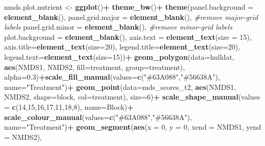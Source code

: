 \documentclass[
]{article}
\newenvironment{Shaded}{\begin{snugshade}}{\end{snugshade}}
\newcommand{\AttributeTok}[1]{\textcolor[rgb]{0.13,0.29,0.53}{#1}}
\newcommand{\CommentTok}[1]{\textcolor[rgb]{0.56,0.35,0.01}{\textit{#1}}}
\newcommand{\DecValTok}[1]{\textcolor[rgb]{0.00,0.00,0.81}{#1}}
\newcommand{\FloatTok}[1]{\textcolor[rgb]{0.00,0.00,0.81}{#1}}
\newcommand{\FunctionTok}[1]{\textcolor[rgb]{0.13,0.29,0.53}{\textbf{#1}}}
\newcommand{\NormalTok}[1]{#1}
\newcommand{\OtherTok}[1]{\textcolor[rgb]{0.56,0.35,0.01}{#1}}
\newcommand{\SpecialCharTok}[1]{\textcolor[rgb]{0.81,0.36,0.00}{\textbf{#1}}}
\newcommand{\StringTok}[1]{\textcolor[rgb]{0.31,0.60,0.02}{#1}}
\begin{document}
\begin{Shaded}
\begin{Highlighting}[]
\NormalTok{nmds.plot.nutrient }\OtherTok{\textless{}{-}} \FunctionTok{ggplot}\NormalTok{()}\SpecialCharTok{+}
  \FunctionTok{theme\_bw}\NormalTok{()}\SpecialCharTok{+}
  \FunctionTok{theme}\NormalTok{(}\AttributeTok{panel.background =} \FunctionTok{element\_blank}\NormalTok{(),}
        \AttributeTok{panel.grid.major =} \FunctionTok{element\_blank}\NormalTok{(),  }\CommentTok{\#remove major{-}grid labels}
        \AttributeTok{panel.grid.minor =} \FunctionTok{element\_blank}\NormalTok{(),  }\CommentTok{\#remove minor{-}grid labels}
        \AttributeTok{plot.background =} \FunctionTok{element\_blank}\NormalTok{(), }
        \AttributeTok{axis.text =} \FunctionTok{element\_text}\NormalTok{(}\AttributeTok{size =} \DecValTok{15}\NormalTok{),}
        \AttributeTok{axis.title=}\FunctionTok{element\_text}\NormalTok{(}\AttributeTok{size=}\DecValTok{20}\NormalTok{),}
        \AttributeTok{legend.title=}\FunctionTok{element\_text}\NormalTok{(}\AttributeTok{size=}\DecValTok{20}\NormalTok{), }
        \AttributeTok{legend.text=}\FunctionTok{element\_text}\NormalTok{(}\AttributeTok{size=}\DecValTok{15}\NormalTok{))}\SpecialCharTok{+}
  \FunctionTok{geom\_polygon}\NormalTok{(}\AttributeTok{data=}\NormalTok{hulldat, }\FunctionTok{aes}\NormalTok{(NMDS1, NMDS2, }\AttributeTok{fill=}\NormalTok{treatment, }\AttributeTok{group=}\NormalTok{treatment), }\AttributeTok{alpha=}\FloatTok{0.3}\NormalTok{)}\SpecialCharTok{+}\FunctionTok{scale\_fill\_manual}\NormalTok{(}\AttributeTok{values=}\FunctionTok{c}\NormalTok{(}\StringTok{"\#63A088"}\NormalTok{,}\StringTok{"\#56638A"}\NormalTok{), }\AttributeTok{name=}\StringTok{"Treatment"}\NormalTok{)}\SpecialCharTok{+}
  \FunctionTok{geom\_point}\NormalTok{(}\AttributeTok{data=}\NormalTok{mds\_scores\_t2, }\FunctionTok{aes}\NormalTok{(NMDS1, NMDS2, }\AttributeTok{shape=}\NormalTok{block, }\AttributeTok{col=}\NormalTok{treatment), }\AttributeTok{size=}\DecValTok{6}\NormalTok{)}\SpecialCharTok{+} \FunctionTok{scale\_shape\_manual}\NormalTok{(}\AttributeTok{values =} \FunctionTok{c}\NormalTok{(}\DecValTok{14}\NormalTok{,}\DecValTok{15}\NormalTok{,}\DecValTok{16}\NormalTok{,}\DecValTok{17}\NormalTok{,}\DecValTok{11}\NormalTok{,}\DecValTok{18}\NormalTok{,}\DecValTok{8}\NormalTok{), }\AttributeTok{name=}\StringTok{\textquotesingle{}Block\textquotesingle{}}\NormalTok{)}\SpecialCharTok{+}
  \FunctionTok{scale\_colour\_manual}\NormalTok{(}\AttributeTok{values=}\FunctionTok{c}\NormalTok{(}\StringTok{"\#63A088"}\NormalTok{,}\StringTok{"\#56638A"}\NormalTok{), }\AttributeTok{name=}\StringTok{"Treatment"}\NormalTok{)}\SpecialCharTok{+}
  \FunctionTok{geom\_segment}\NormalTok{(}\FunctionTok{aes}\NormalTok{(}\AttributeTok{x =} \DecValTok{0}\NormalTok{, }\AttributeTok{y =} \DecValTok{0}\NormalTok{, }\AttributeTok{xend =}\NormalTok{ NMDS1, }\AttributeTok{yend =}\NormalTok{ NMDS2), }

\end{Highlighting}
\end{Shaded}
\end{document}
